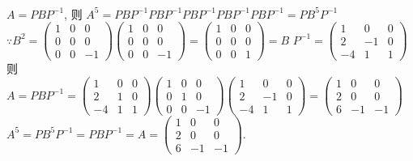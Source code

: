 	 \paragraph{} %
		 $A = PBP^{-1}$, 则 $A^5 = PBP^{-1}PBP^{-1}PBP^{-1}PBP^{-1}PBP^{-1} = PB^5P^{-1}$
		 $\because B^2 = \begin{pmatrix}
				 1 & 0 & 0  \\
				 0 & 0 & 0  \\
				 0 & 0 & -1
			 \end{pmatrix}
			 \begin{pmatrix}
				 1 & 0 & 0  \\
				 0 & 0 & 0  \\
				 0 & 0 & -1
			 \end{pmatrix} = \begin{pmatrix}
				 1 & 0 & 0 \\
				 0 & 0 & 0 \\
				 0 & 0 & 1
			 \end{pmatrix} = B$
		 $P^{-1} = \begin{pmatrix}
				 1  & 0  & 0 \\
				 2  & -1 & 0 \\
				 -4 & 1  & 1
			 \end{pmatrix}$
		 则 $A = PBP^{-1} = \begin{pmatrix}
				 1  & 0 & 0 \\
				 2  & 1 & 0 \\
				 -4 & 1 & 1
			 \end{pmatrix}
			 \begin{pmatrix}
				 1 & 0 & 0  \\
				 0 & 1 & 0  \\
				 0 & 0 & -1
			 \end{pmatrix}
			 \begin{pmatrix}
				 1  & 0  & 0 \\
				 2  & -1 & 0 \\
				 -4 & 1  & 1
			 \end{pmatrix} = \begin{pmatrix}
				 1 & 0  & 0  \\
				 2 & 0  & 0  \\
				 6 & -1 & -1
			 \end{pmatrix}$
		 $A^5 = PB^5P^{-1} = PBP^{-1} = A = \begin{pmatrix}
				 1 & 0  & 0  \\
				 2 & 0  & 0  \\
				 6 & -1 & -1
			 \end{pmatrix}$.


